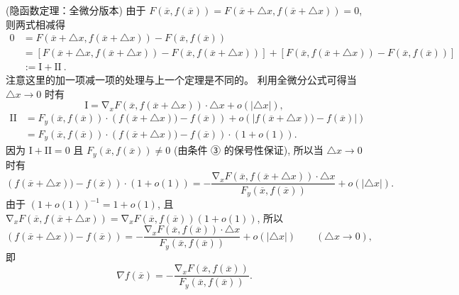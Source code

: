 \begin{theorem}{(隐函数定理：全微分版本)}
由于 $F(\overline{x},f(\overline{x}))=F(\overline{x}+\triangle x,f(\overline{x}+\triangle x))=0$,
则两式相减得
\begin{equation}
\begin{aligned}
0 & = F(\overline{x}+\triangle x,f(\overline{x}+\triangle x))-F(\overline{x},f(\overline{x}))\\
 & = \left[F(\overline{x}+\triangle x,f(\overline{x}+\triangle x))-F(\overline{x},f(\overline{x}+\triangle x))\right]+\left[F(\overline{x},f(\overline{x}+\triangle x))-F(\overline{x},f(\overline{x}))\right]\\
 & := \mathrm{I}+\mathrm{II}~.
\end{aligned}
\end{equation}
注意这里的加一项减一项的处理与上一个定理是不同的。 利用全微分公式可得当 $\triangle x\rightarrow0$ 时有
\[
\mathrm{I}=\mathrm{\nabla}_{x}F(\overline{x},f(\overline{x}+\triangle x))\cdot\triangle x+o(|\triangle x|),
\]
\begin{equation}
\begin{aligned}
\mathrm{II} & = F_{y}(\overline{x},f(\overline{x}))\cdot\left(f(\overline{x}+\triangle x))-f(\overline{x})\right)+o\left(|f(\overline{x}+\triangle x))-f(\overline{x})|\right)\\
 & = F_{y}(\overline{x},f(\overline{x}))\cdot\left(f(\overline{x}+\triangle x))-f(\overline{x})\right)\cdot(1+o(1)).
\end{aligned}
\end{equation}
因为 $\mathrm{I}+\mathrm{II}=0$ 且 $F_{y}(\overline{x},f(\overline{x}))\neq0$
(由条件 ③ 的保号性保证), 所以当 $\triangle x\rightarrow0$ 时有
\[
\left(f(\overline{x}+\triangle x))-f(\overline{x})\right)\cdot(1+o(1))={\displaystyle -\frac{\mathrm{\nabla}_{x}F(\overline{x},f(\overline{x}+\triangle x))\cdot\triangle x}{F_{y}(\overline{x},f(\overline{x}))}+o(|\triangle x|).}
\]
由于 $(1+o(1))^{-1}=1+o(1)$, 且 $\mathrm{\nabla}_{x}F(\overline{x},f(\overline{x}+\triangle x))=\mathrm{\nabla}_{x}F(\overline{x},f(\overline{x}))(1+o(1))$,
所以
\[
\left(f(\overline{x}+\triangle x))-f(\overline{x})\right)={\displaystyle -\frac{\mathrm{\nabla}_{x}F(\overline{x},f(\overline{x}))\cdot\triangle x}{F_{y}(\overline{x},f(\overline{x}))}+o(|\triangle x|)\quad\quad(\triangle x\rightarrow0),}
\]
即 
\[
\nabla f(\overline{x})=-\frac{\mathrm{\nabla}_{x}F(\overline{x},f(\overline{x}))}{F_{y}(\overline{x},f(\overline{x}))}.
\]
\end{theorem}
